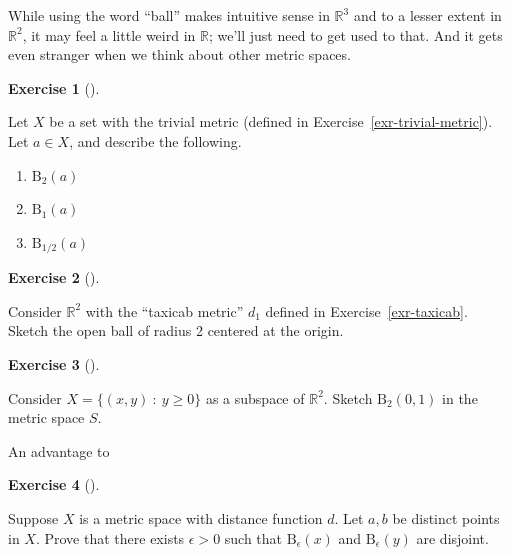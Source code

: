 \documentclass[
  letterpaper,
  DIV=11,
  numbers=noendperiod]{scrreprt}
\providecommand{\tightlist}{%
  \setlength{\itemsep}{0pt}\setlength{\parskip}{0pt}}
\def\R{\mathbb R}
\newcommand{\st}{~:~}
\newcommand{\bee}{\mathrm{B}}
\theoremstyle{plain}
\theoremstyle{definition}
\newtheorem{exercise}{Exercise}[chapter]
\theoremstyle{plain}
\theoremstyle{plain}
\theoremstyle{definition}
\theoremstyle{definition}
\theoremstyle{remark}
\begin{document}
While using the word ``ball'' makes intuitive sense in \(\R^3\) and to a
lesser extent in \(\R^2\), it may feel a little weird in \(\R\); we'll
just need to get used to that. And it gets even stranger when we think
about other metric spaces.

\begin{exercise}[]\protect\hypertarget{exr-open-balls-in-trivial-ms}{}\label{exr-open-balls-in-trivial-ms}

Let \(X\) be a set with the trivial metric (defined in
Exercise~\ref{exr-trivial-metric}). Let \(a\in X\), and describe the
following.

\begin{enumerate}
\def\labelenumi{\arabic{enumi}.}
\tightlist
\item
  \(\bee_2(a)\)
\item
  \(\bee_1(a)\)
\item
  \(\bee_{1/2}(a)\)
\end{enumerate}

\end{exercise}

\begin{exercise}[]\protect\hypertarget{exr-open-balls-in-trivial-ms}{}\label{exr-open-balls-in-trivial-ms}

Consider \(\R^2\) with the ``taxicab metric'' \(d_1\) defined in
Exercise~\ref{exr-taxicab}. Sketch the open ball of radius 2 centered at
the origin.

\end{exercise}

\begin{exercise}[]\protect\hypertarget{exr-open-balls-in-subspace}{}\label{exr-open-balls-in-subspace}

Consider \(X=\{(x,y)\st y\geq0\}\) as a subspace of \(\R^2\). Sketch
\(\bee_2(0,1)\) in the metric space \(S\).

\end{exercise}

An advantage to

\begin{exercise}[]\protect\hypertarget{exr-hausdorff}{}\label{exr-hausdorff}

Suppose \(X\) is a metric space with distance function \(d\). Let
\(a,b\) be distinct points in \(X\). Prove that there exists
\(\epsilon>0\) such that \(\bee_\epsilon(x)\) and \(\bee_\epsilon(y)\)
are disjoint.

\end{exercise}
\end{document}
